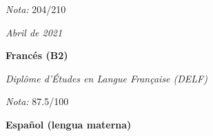 \documentclass[10pt, letterpaper]{article}
\begin{document}
        \vspace{0.10 cm}
        \begin{onecolentry}
            \begin{highlights}
                \item \emph{Nota:} 204/210 %
            \end{highlights}
        \end{onecolentry}

        \vspace{0.2 cm}
    
        \begin{twocolentry}{
            
        \textit{Abril de 2021}}
            \textbf{Francés (B2)}

            \textit{Diplôme d'Études en Langue Française (DELF)}
        \end{twocolentry}

        \vspace{0.10 cm}
        \begin{onecolentry}
            \begin{highlights}
                \item \emph{Nota:} 87.5/100 %
            \end{highlights}
        \end{onecolentry}

        \vspace{0.2 cm}

        \begin{onecolentry}
            \textbf{Español (lengua materna)}
        \end{onecolentry}
\end{document}

